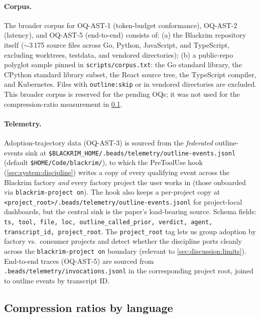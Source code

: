 \paragraph{Corpus.} The broader corpus for OQ-AST-1 (token-budget
conformance), OQ-AST-2 (latency), and OQ-AST-5 (end-to-end) consists
of: (a) the Blackrim repository itself ($\sim$3\,175 source files
across Go, Python, JavaScript, and TypeScript, excluding worktrees,
testdata, and vendored directories); (b) a public-repo polyglot sample
pinned in \texttt{scripts/corpus.txt}: the Go standard library, the
CPython standard library subset, the React source tree, the TypeScript
compiler, and Kubernetes. Files with \texttt{outline:skip} or in
vendored directories are excluded. This broader corpus is reserved for
the pending OQs; it was not used for the compression-ratio measurement
in \cref{sec:eval:compression}.

\paragraph{Telemetry.}{\sloppy
Adoption-trajectory data (OQ-AST-3) is sourced
from the \emph{federated} outline-events sink at
\texttt{\$BLACKRIM\_HOME/.beads/telemetry/outline-events.jsonl}
(default \texttt{\$HOME/Code/blackrim/}), to which the PreToolUse
hook (\cref{sec:system:discipline}) writes a copy of every qualifying
event across the Blackrim factory \emph{and} every factory project the
user works in (those onboarded via \texttt{blackrim-project on}). The
hook also keeps a per-project copy at
\texttt{<project\_root>/.beads/telemetry/outline-events.jsonl}
for project-local dashboards, but the central sink is the
paper's load-bearing source. Schema fields:
\texttt{ts, tool, file, loc, outline\_called\_prior, verdict, agent,
transcript\_id, project\_root}. The
\texttt{project\_root} tag lets us group adoption by factory vs.\
consumer projects and detect whether the discipline ports cleanly
across the \texttt{blackrim-project on} boundary (relevant to
\cref{sec:discussion:limits}). End-to-end traces (OQ-AST-5) are
sourced from \texttt{.beads/telemetry/invocations.jsonl} in the
corresponding project root, joined to outline events by transcript ID.\par}

\subsection{Compression ratios by language}
\label{sec:eval:compression}

